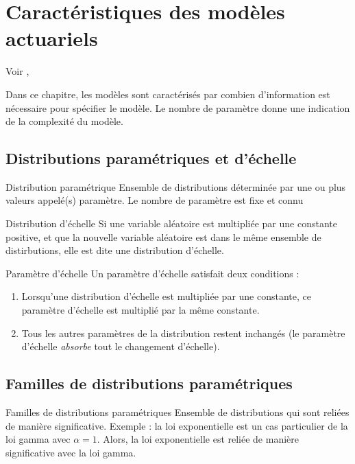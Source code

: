 \chapter{Caractéristiques des modèles actuariels}

Voir \cite{klugman2012loss}, 

Dans ce chapitre, les modèles sont caractérisés par combien d'information est nécessaire pour spécifier le modèle. Le nombre de paramètre donne une indication de la complexité du modèle. 

\section{Distributions paramétriques et d'échelle}

\begin{definition}{Distribution paramétrique}{}
	Ensemble de distributions déterminée par une ou plus valeurs appelé(s) paramètre. Le nombre de paramètre est fixe et connu
\end{definition}

\begin{definition}{Distribution d'échelle}{}
	Si une variable aléatoire est multipliée par une constante positive, et que la nouvelle variable aléatoire est dans le même ensemble de distirbutions, elle est dite une distribution d'échelle.
\end{definition}

\begin{definition}{Paramètre d'échelle}{}
	Un paramètre d'échelle satisfait deux conditions : 
	\begin{enumerate}
		\item Lorsqu'une distribution d'échelle est multipliée par une constante, ce paramètre d'échelle est multiplié par la même constante.
		\item Tous les autres paramètres de la distribution restent inchangés (le paramètre d'échelle \textit{absorbe} tout le changement d'échelle).
	\end{enumerate}
\end{definition}

\section{Familles de distributions paramétriques}

\begin{definition}{Familles de distributions paramétriques}{}
	Ensemble de distributions qui sont reliées de manière significative. Exemple : la loi exponentielle est un cas particulier de la loi gamma avec $\alpha = 1$. Alors, la loi exponentielle est reliée de manière significative avec la loi gamma. 
\end{definition}

